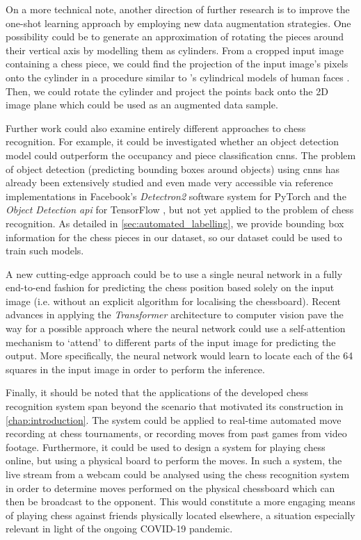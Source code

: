 \documentclass[../main.tex]{subfiles}
\begin{document}
On a more technical note, another direction of further research is to improve the one-shot learning approach by employing new data augmentation strategies.
One possibility could be to generate an approximation of rotating the pieces around their vertical axis by modelling them as cylinders.
From a cropped input image containing a chess piece, we could find the projection of the input image's pixels onto the cylinder in a procedure similar to \citeauthor{sung2008}'s cylindrical models of human faces \cite{sung2008}.
Then, we could rotate the cylinder and project the points back onto the 2D image plane which could be used as an augmented data sample.

Further work could also examine entirely different approaches to chess recognition. 
For example, it could be investigated whether an object detection model could outperform the occupancy and piece classification \glspl{cnn}.
The problem of object detection (predicting bounding boxes around objects) using \glspl{cnn} has already been extensively studied and even made very accessible via reference implementations in Facebook's \emph{Detectron2} software system for PyTorch \cite{wu2019detectron2}  and the \emph{Object Detection \acs{api}} for TensorFlow \cite{tfodapi2020}, but not yet applied to the problem of chess recognition.
As detailed in \cref{sec:automated_labelling}, we provide bounding box information for the chess pieces in our dataset, so our dataset could be used to train such models.

A new cutting-edge approach could be to use a single neural network in a fully end-to-end fashion for predicting the chess position based solely on the input image (i.e. without an explicit algorithm for localising the chessboard).
Recent advances in applying the \emph{Transformer} architecture \cite{vaswani2017} to computer vision \cite{wu2020,anonymous2020} pave the way for a possible approach where the neural network could use a self-attention mechanism to `attend' to different parts of the input image for predicting the output.
More specifically, the neural network would learn to locate each of the 64 squares in the input image in order to perform the inference.

Finally, it should be noted that the applications of the developed chess recognition system span beyond the scenario that motivated its construction in \cref{chap:introduction}.
The system could be applied to real-time automated move recording at chess tournaments, or recording moves from past games from video footage.
Furthermore, it could be used to design a system for playing chess online, but using a physical board to perform the moves.
In such a system, the live stream from a webcam could be analysed using the chess recognition system in order to determine moves performed on the physical chessboard which can then be broadcast to the opponent.
This would constitute a more engaging means of playing chess against friends physically located elsewhere, a situation especially relevant in light of the ongoing COVID-19 pandemic.

\ifSubfilesClassLoaded{%
\printglossary[type=\acronymtype]%
\printbibliography%
}{}%
\end{document}
